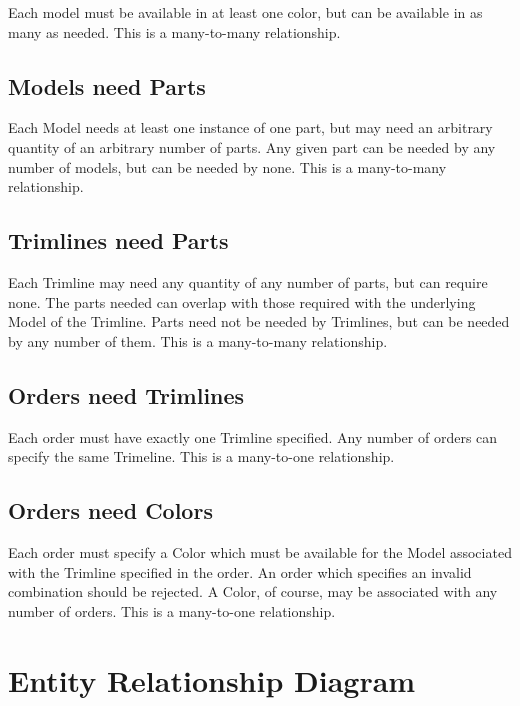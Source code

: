 \documentclass[11pt,letterpaper,oneside]{amsart}
\begin{document}
Each model must be available in at least one color, but can be available in as many as needed.  This is a many-to-many relationship.

\subsection*{Models need Parts}

Each Model needs at least one instance of one part, but may need an arbitrary quantity of an arbitrary number of parts.  Any given part can be needed by any number of models, but can be needed by none.  This is a many-to-many relationship.

\subsection*{Trimlines need Parts}

Each Trimline may need any quantity of any number of parts, but can require none.  The parts needed can overlap with those required with the underlying Model of the Trimline.  Parts need not be needed by Trimlines, but can be needed by any number of them.  This is a many-to-many relationship. 

\subsection*{Orders need Trimlines}

Each order must have exactly one Trimline specified.  Any number of orders can specify the same Trimeline.  This is a many-to-one relationship.

\subsection*{Orders need Colors}

Each order must specify a Color which must be available for the Model associated with the Trimline specified in the order.  An order which specifies an invalid combination should be rejected.  A Color, of course, may be associated with any number of orders.  This is a many-to-one relationship.

\section*{Entity Relationship Diagram}
\end{document}
